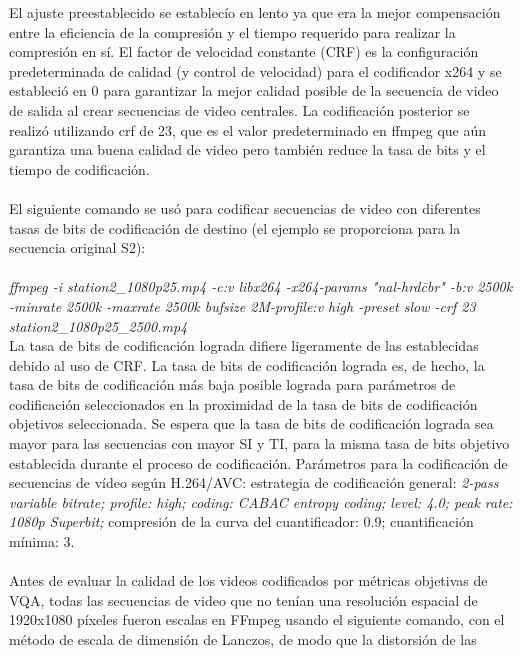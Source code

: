\documentclass[conference]{IEEEtran}
\begin{document}
    El ajuste preestablecido se establecío en lento ya que era la mejor 
    compensación entre la eficiencia de la compresión y el tiempo 
    requerido para realizar la compresión en sí. El factor de velocidad 
    constante (CRF) es la configuración predeterminada de calidad (y 
    control de velocidad) para el codificador x264 y se estableció en 0 
    para garantizar la mejor calidad posible de la secuencia de video de 
    salida al crear secuencias de video centrales. La codificación 
    posterior se realizó utilizando crf de 23, que es el valor 
    predeterminado en ffmpeg que aún garantiza una buena calidad de 
    video pero también reduce la tasa de bits y el tiempo de codificación.\\
    \\
    El siguiente comando se usó para codificar secuencias de video con 
    diferentes tasas de bits de codificación de destino (el ejemplo se 
    proporciona para la secuencia original S2):\\
    \\ 
    \textsl{ffmpeg -i station2\_1080p25.mp4 -c:v libx264 -x264-params 
    "nal-hrd\=cbr" -b:v 2500k -minrate 2500k -maxrate 2500k bufsize 
    2M-profile:v high -preset slow -crf 23 station2\_1080p25\_2500.mp4}
    \\
    La tasa de bits de codificación lograda difiere ligeramente de las 
    establecidas debido al uso de CRF. La tasa de bits de codificación 
    lograda es, de hecho, la tasa de bits de codificación más baja posible 
    lograda para parámetros de codificación seleccionados en la 
    proximidad de la tasa de bits de codificación objetivos seleccionada.
    Se espera que la tasa de bits de codificación lograda sea mayor para 
    las secuencias con mayor SI y TI, para la misma tasa de bits objetivo 
    establecida durante el proceso de codificación. Parámetros para la 
    codificación de secuencias de vídeo según H.264/AVC: estrategia de 
    codificación general: \textsl{2-pass variable bitrate; profile: high; 
    coding: CABAC entropy coding; level: 4.0; peak rate: 1080p Superbit;} 
    compresión de la curva del cuantificador: 0.9; cuantificación mínima:
    3.\\
    \\
    Antes de evaluar la calidad de los videos codificados por 
    métricas objetivas de VQA, todas las secuencias de video que no 
    tenían una resolución espacial de 1920x1080 píxeles fueron 
    escalas en FFmpeg usando el siguiente comando, con el método 
    de escala de dimensión de Lanczos, de modo que la distorsión de las 
\end{document}
